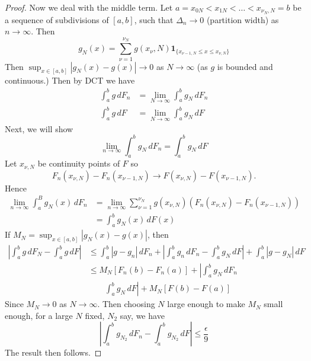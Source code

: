 \documentclass[10pt, oneside, reqno]{amsart}
\theoremstyle{plain}%
\theoremstyle{definition}
\theoremstyle{remark}
\newcommand{\indic}[1]{\mathbf{1}_{\{ #1 \}} }
\begin{document}
\begin{proof}
	Now we deal with the middle term.  Let $a = x_{0N} < x_{1N} < \dots < x_{\nu_N, N} = b$ be a sequence of subdivisions of $[a,b]$, such that $\Delta_{n} \rightarrow 0$ (partition width) as $n \rightarrow \infty$.  Then \[
		g_N(x) = \sum_{\nu = 1}^{\nu_N} g(x_{\nu}, N) \indic{x_{\nu-1, N} \leq x \leq x_{\nu, N}} 
	\]  Then $\sup_{x \in [a,b]} | g_N(x) - g(x)| \rightarrow 0$ as $N \rightarrow \infty$ (as $g$ is bounded and continuous.) Then by DCT we have 
	\begin{align*}
		\int_a^b g \, dF_n &= \lim_{N \rightarrow \infty} \int_a^b g_N \, dF_n \\
		\int_a^b g \, dF &= \lim_{N \rightarrow \infty} \int_a^b g_N \, dF
	\end{align*}   Next, we will show \[
		\lim_{ n \rightarrow \infty} \int_a^b g_N \, dF_n = \int_a^b g_N \, dF
	\]  Let $x_{\nu, N}$ be continuity points of $F$ so \[
		F_n(x_{\nu, N}) - F_n(x_{\nu - 1, N}) \rightarrow F(x_{\nu, N}) - F(x_{\nu - 1, N}).
	\] Hence
	\begin{align*}
		\lim_{n \rightarrow \infty} \int_a^B g_N(x) \, dF_n &= \lim_{n \rightarrow \infty} \sum_{\nu = 1}^{\nu_N} g(x_{\nu, N}) (F_n(x_{\nu, N}) - F_n(x_{\nu - 1, N})) \\
		&= \int_a^b g_N(x) \, dF(x) 
	\end{align*} If $M_N = \sup_{x \in [a,b]} | g_N(x) - g(x) |$, then \begin{align*}
		\left| \int_a^b g \, dF_N - \int_a^b g \, dF \right| &\leq \int_a^b |g - g_n | \, dF_n + \left| \int_a^b g_n \, dF_n - \int_a^b g_N \, dF \right| + \int_a^b |g - g_N | \, dF \\
		&\leq M_N [ F_n(b) - F_n(a)] + \left| \int_a^b g_N \, dF_n  \right.\\
		&\qquad \left. \int_a^b g_N \, dF \right| + M_N[F(b) - F(a)] 
	\end{align*} Since $M_N \rightarrow 0$ as $N \rightarrow \infty$.  Then choosing $N$ large enough to make $M_N$ small enough, for a large $N$ fixed, $N_2$ say, we have \[
		\left| \int_a^b g_{N_2} \, dF_n - \int_a^b g_{N_2} \, dF \right| \leq \frac{\epsilon}{9}
	\]  The result then follows.
\end{proof}  
\end{document}
